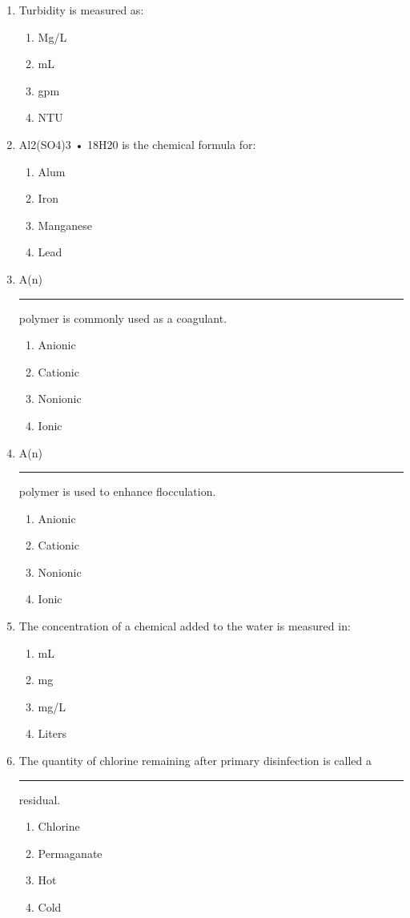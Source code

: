 \begin{enumerate}
\item Turbidity is measured as:
\begin{enumerate}
\item Mg/L
\item mL
\item gpm
\item NTU
\end{enumerate}

\item Al2(SO4)3 • 18H20 is the chemical formula for:
\begin{enumerate}
\item Alum
\item Iron
\item Manganese
\item Lead
\end{enumerate}

\item A(n) \rule{1cm}{0.5pt}  polymer is commonly used as a coagulant.
\begin{enumerate}
\item Anionic
\item Cationic
\item Nonionic
\item Ionic
\end{enumerate}

\item A(n) \rule{1cm}{0.5pt}  polymer is used to enhance flocculation.
\begin{enumerate}
\item Anionic
\item Cationic
\item Nonionic
\item Ionic
\end{enumerate}

\item The concentration of a chemical added to the water is measured in:
\begin{enumerate}
\item mL
\item mg
\item mg/L
\item Liters
\end{enumerate}

\item The quantity of chlorine remaining after primary disinfection is called a
\rule{1cm}{0.5pt}  residual.
\begin{enumerate}
\item Chlorine
\item Permaganate
\item Hot
\item Cold
\end{enumerate}


\end{enumerate}
